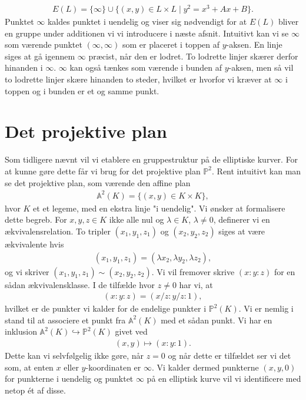 \begin{align}
\label{elliptic_curve_points}
	E(L) = \{ \infty \} \cup \{ (x, y) \in L \times L \mid y^2 = x^3 + Ax + B \}.
\end{align}
Punktet $\infty$ kaldes punktet i uendelig og viser sig nødvendigt for at $E(L)$ bliver en gruppe under additionen vi vi introducere i næste afsnit. Intuitivt kan vi se $\infty$ som værende punktet $(\infty, \infty)$ som er placeret i toppen af $y$-aksen. En linje siges at gå igennem $\infty$ præcist, når den er lodret. To lodrette linjer skærer derfor hinanden i $\infty$. $\infty$ kan også tænkes som værende i bunden af $y$-aksen, men så vil to lodrette linjer skære hinanden to steder, hvilket er hvorfor vi kræver at $\infty$ i toppen og i bunden er et og samme punkt.


\section{Det projektive plan}
Som tidligere nævnt vil vi etablere en gruppestruktur på de elliptiske
kurver. For at kunne gøre dette får vi brug for det projektive plan 
$\mathbb{P}^2$. Rent intuitivt kan man se det projektive plan, som
værende den affine plan 
\begin{align*}
	\mathbb{A}^2(K) = \{ (x, y) \in K \times K \},
\end{align*}
hvor $K$ et et legeme, med en ekstra linje "i uendelig". 
Vi ønsker at formalisere dette begreb. 
For $x, y, z \in K$ ikke alle nul og $\lambda \in K$, $\lambda \neq 0$, 
definerer vi en ækvivalensrelation. To tripler $(x_1, y_1, z_1)$ og 
$(x_2, y_2, z_2)$ siges at være ækvivalente hvis 
\begin{align*}
	(x_1, y_1, z_1) = (\lambda x_2, \lambda y_2, \lambda z_2),
\end{align*}
og vi skriver $(x_1, y_1, z_1) \sim (x_2, y_2, z_2)$. Vi vil fremover skrive
$(x:y:z)$ for en sådan ækvivalensklasse. I de tilfælde hvor $z \neq 0$ har vi, at
\begin{align*}
	(x : y : z) = (x/z : y/z : 1),
\end{align*}
hvilket er de punkter vi kalder for de endelige punkter i $\mathbb{P}^2(K)$.
Vi er nemlig i stand til at associere et punkt fra $\mathbb{A}^2(K)$ med et sådan
punkt. Vi har en inklusion $\mathbb{A}^2(K) \hookrightarrow \mathbb{P}^2(K)$ givet ved
\begin{align*}
	(x, y) \mapsto (x : y : 1).
\end{align*}
Dette kan vi selvfølgelig ikke gøre, når $z=0$ og når dette er tilfældet ser vi det som, at enten $x$ eller $y$-koordinaten er $\infty$. Vi kalder dermed punkterne
$(x, y, 0)$ for punkterne i uendelig og punktet $\infty$ på en elliptisk kurve vil vi identificere med netop ét af disse.

